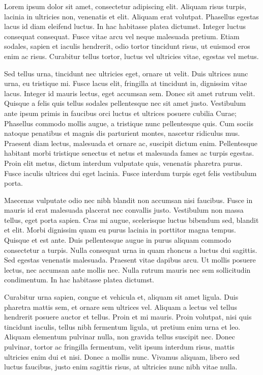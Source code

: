 \documentclass[12pt]{report}
\begin{document}
\begin{large}

Lorem ipsum dolor sit amet, consectetur adipiscing elit. Aliquam risus
turpis, lacinia in ultricies non, venenatis et elit. Aliquam erat
volutpat. Phasellus egestas lacus id diam eleifend luctus. In hac
habitasse platea dictumst. Integer luctus consequat consequat. Fusce
vitae arcu vel neque malesuada pretium. Etiam sodales, sapien et
iaculis hendrerit, odio tortor tincidunt risus, ut euismod eros enim
ac risus. Curabitur tellus tortor, luctus vel ultricies vitae, egestas
vel metus.

Sed tellus urna, tincidunt nec ultricies eget, ornare ut velit. Duis
ultrices nunc urna, eu tristique mi. Fusce lacus elit, fringilla at
tincidunt in, dignissim vitae lacus. Integer id mauris lectus, eget
accumsan sem. Donec sit amet rutrum velit. Quisque a felis quis tellus
sodales pellentesque nec sit amet justo. Vestibulum ante ipsum primis
in faucibus orci luctus et ultrices posuere cubilia Curae; Phasellus
commodo mollis augue, a tristique nunc pellentesque quis. Cum sociis
natoque penatibus et magnis dis parturient montes, nascetur ridiculus
mus. Praesent diam lectus, malesuada et ornare ac, suscipit dictum
enim. Pellentesque habitant morbi tristique senectus et netus et
malesuada fames ac turpis egestas. Proin elit metus, dictum interdum
vulputate quis, venenatis pharetra purus. Fusce iaculis ultrices dui
eget lacinia. Fusce interdum turpis eget felis vestibulum porta.

Maecenas vulputate odio nec nibh blandit non accumsan nisi faucibus.
Fusce in mauris id erat malesuada placerat nec convallis justo.
Vestibulum non massa tellus, eget porta sapien. Cras mi augue,
scelerisque luctus bibendum sed, blandit et elit. Morbi dignissim quam
eu purus lacinia in porttitor magna tempus. Quisque et est ante. Duis
pellentesque augue in purus aliquam commodo consectetur a turpis.
Nulla consequat urna in quam rhoncus a luctus dui sagittis. Sed
egestas venenatis malesuada. Praesent vitae dapibus arcu. Ut mollis
posuere lectus, nec accumsan ante mollis nec. Nulla rutrum mauris nec
sem sollicitudin condimentum. In hac habitasse platea dictumst.

Curabitur urna sapien, congue et vehicula et, aliquam sit amet ligula.
Duis pharetra mattis sem, et ornare sem ultrices vel. Aliquam a lectus
vel tellus hendrerit posuere auctor et tellus. Proin et mi mauris.
Proin volutpat, nisi quis tincidunt iaculis, tellus nibh fermentum
ligula, ut pretium enim urna et leo. Aliquam elementum pulvinar nulla,
non gravida tellus suscipit nec. Donec pulvinar, tortor ac fringilla
fermentum, velit ipsum interdum risus, mattis ultricies enim dui et
nisi. Donec a mollis nunc. Vivamus aliquam, libero sed luctus
faucibus, justo enim sagittis risus, at ultricies nunc nibh vitae
nulla.


\end{large}
\end{document}
